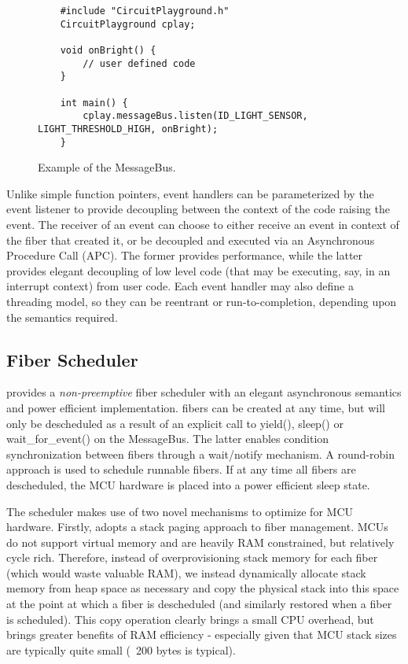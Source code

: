 \begin{figure}
    \begin{lstlisting}
    #include "CircuitPlayground.h"
    CircuitPlayground cplay;

    void onBright() {
        // user defined code
    }

    int main() {
        cplay.messageBus.listen(ID_LIGHT_SENSOR, LIGHT_THRESHOLD_HIGH, onBright);
    }
    \end{lstlisting}
    \caption{\label{fig:messageBus}Example of the \CO MessageBus.}
\end{figure}

Unlike simple function pointers, \CO event handlers can be parameterized by the event listener to provide decoupling between the context of the code raising the event. The receiver of an event can choose to either receive an event in context of the fiber that created it, or be decoupled and executed via an Asynchronous Procedure Call (APC). The former provides performance, while the latter provides elegant decoupling of low level code (that may be executing, say, in an interrupt context) from user code. Each event handler may also define a threading model, so they can be reentrant or run-to-completion, depending upon the semantics required.

\subsection{Fiber Scheduler}
\CO provides a \emph{non-preemptive} fiber scheduler with an elegant asynchronous semantics and power efficient implementation. \CO fibers can be created at any time, but will only be descheduled as a result of an explicit call to yield(), sleep() or wait\_for\_event() on the MessageBus. The latter enables condition synchronization between fibers through a wait/notify mechanism. A round-robin approach is used to schedule runnable fibers. If at any time all fibers are descheduled, the MCU hardware is placed into a power efficient sleep state.

The \CO scheduler makes use of two novel mechanisms to optimize for MCU hardware. Firstly, \CO adopts a stack paging approach to fiber management. MCUs do not support virtual memory and are heavily RAM constrained, but relatively cycle rich. Therefore, instead of overprovisioning stack memory for each fiber (which would waste valuable RAM), we instead dynamically allocate stack memory from heap space as necessary and copy the physical stack into this space at the point at which a fiber is descheduled (and similarly restored when a fiber is scheduled). This copy operation clearly brings a small CPU overhead, but brings greater benefits of RAM efficiency - especially given that MCU stack sizes are typically quite small (~200 bytes is typical).


